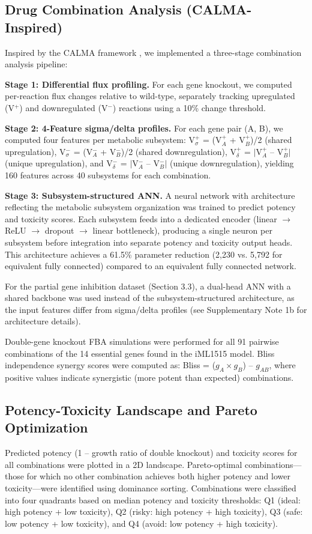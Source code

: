 \documentclass[12pt,a4paper]{article}
\begin{document}
\subsection{Drug Combination Analysis (CALMA-Inspired)}
Inspired by the CALMA framework \citep{arora2026}, we implemented a three-stage combination analysis pipeline:

\textbf{Stage 1: Differential flux profiling.} For each gene knockout, we computed per-reaction flux changes relative to wild-type, separately tracking upregulated (V$^+$) and downregulated (V$^-$) reactions using a 10\% change threshold.

\textbf{Stage 2: 4-Feature sigma/delta profiles.} For each gene pair (A, B), we computed four features per metabolic subsystem: V$^+_\sigma$ = (V$^+_A$ + V$^+_B$)/2 (shared upregulation), V$^-_\sigma$ = (V$^-_A$ + V$^-_B$)/2 (shared downregulation), V$^+_\delta$ = $|$V$^+_A$ -- V$^+_B$$|$ (unique upregulation), and V$^-_\delta$ = $|$V$^-_A$ -- V$^-_B$$|$ (unique downregulation), yielding 160 features across 40 subsystems for each combination.

\textbf{Stage 3: Subsystem-structured ANN.} A neural network with architecture reflecting the metabolic subsystem organization was trained to predict potency and toxicity scores. Each subsystem feeds into a dedicated encoder (linear $\rightarrow$ ReLU $\rightarrow$ dropout $\rightarrow$ linear bottleneck), producing a single neuron per subsystem before integration into separate potency and toxicity output heads. This architecture achieves a 61.5\% parameter reduction (2,230 vs. 5,792 for equivalent fully connected) compared to an equivalent fully connected network.

For the partial gene inhibition dataset (Section 3.3), a dual-head ANN with a shared backbone was used instead of the subsystem-structured architecture, as the input features differ from sigma/delta profiles (see Supplementary Note 1b for architecture details).

Double-gene knockout FBA simulations were performed for all 91 pairwise combinations of the 14 essential genes found in the iML1515 model. Bliss independence synergy scores \citep{bliss1939} were computed as: Bliss = ($g_A \times g_B$) -- $g_{AB}$, where positive values indicate synergistic (more potent than expected) combinations.

\subsection{Potency-Toxicity Landscape and Pareto Optimization}
Predicted potency (1 -- growth ratio of double knockout) and toxicity scores for all combinations were plotted in a 2D landscape. Pareto-optimal combinations---those for which no other combination achieves both higher potency and lower toxicity---were identified using dominance sorting. Combinations were classified into four quadrants based on median potency and toxicity thresholds: Q1 (ideal: high potency + low toxicity), Q2 (risky: high potency + high toxicity), Q3 (safe: low potency + low toxicity), and Q4 (avoid: low potency + high toxicity).
\end{document}
